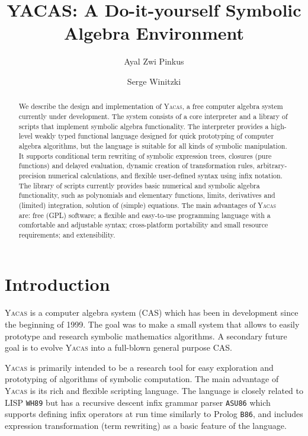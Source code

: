 \documentclass{llncs}
\begin{document}
\title{YACAS: A Do-it-yourself Symbolic Algebra Environment}

\author{Ayal Zwi Pinkus \and Serge Winitzki}

\maketitle

\begin{abstract}
We describe the design and implementation of \textsc{Yacas}, a free computer
algebra system currently under development.  The system consists of a core
interpreter and a library of scripts that implement symbolic algebra
functionality.  The interpreter provides a high-level weakly typed functional
language designed for quick prototyping of computer algebra algorithms, but the 
language is suitable for all kinds of symbolic manipulation. It supports
conditional term rewriting of symbolic expression trees, closures (pure
functions) and delayed evaluation, dynamic creation of transformation rules,
arbitrary-precision numerical calculations, and flexible user-defined syntax
using infix notation.  The library of scripts currently provides basic
numerical and symbolic algebra functionality, such as polynomials and
elementary functions, limits, derivatives and (limited) integration, solution
of (simple) equations. The main advantages of \textsc{Yacas} are: free (GPL)
software; a
flexible and easy-to-use programming language with a comfortable and adjustable
syntax; cross-platform portability and small resource requirements; and extensibility.
\end{abstract}



\section{%
Introduction}
\textsc{Yacas} is a computer algebra system (CAS) which has been in development since the beginning of 1999.
The goal was to make a small system that allows to easily prototype and
research symbolic mathematics algorithms. A secondary future goal is to evolve
\textsc{Yacas} into a full-blown general purpose CAS.

\textsc{Yacas} is primarily intended to be a research tool for easy
exploration and prototyping of algorithms of symbolic
computation.  The main advantage of \textsc{Yacas} is its rich and flexible
scripting language. The language is closely related to LISP \small{\texttt{WH89}} but has
a recursive descent infix grammar parser \small{\texttt{ASU86}} which supports defining 
infix operators at run time similarly to Prolog \small{\texttt{B86}}, and includes 
expression transformation (term rewriting) as a basic feature of the
language.
\end{document}
